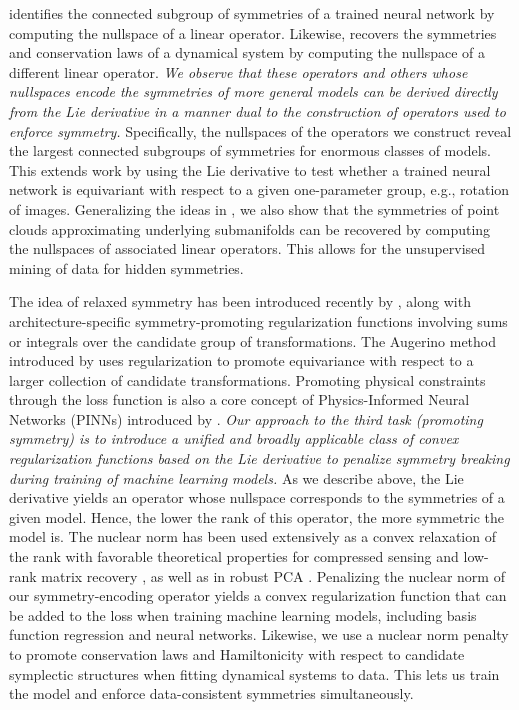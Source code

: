 \documentclass[twoside,11pt]{article}
\begin{document}
\citet{Moskalev2022liegg} identifies the connected subgroup of symmetries of a trained neural network by computing the nullspace of a linear operator.
Likewise, \citet{Kaiser2018discovering,kaiser2021data} recovers the symmetries and conservation laws of a dynamical system by computing the nullspace of a different linear operator.
\emph{We observe that these operators and others whose nullspaces encode the symmetries of more general models can be derived directly from the Lie derivative in a manner dual to the construction of operators used to enforce symmetry.}
Specifically, the nullspaces of the operators we construct reveal the largest connected subgroups of symmetries for enormous classes of models.
This extends work by \cite{Gruver2022Lie} using the Lie derivative to test whether a trained neural network is equivariant with respect to a given one-parameter group, e.g., rotation of images.
Generalizing the ideas in \citet{Cahill2023Lie}, we also show that the symmetries of point clouds approximating underlying submanifolds can be recovered by computing the nullspaces of associated linear operators.
This allows for the unsupervised mining of data for hidden symmetries.

The idea of relaxed symmetry has been introduced recently by \cite{Wang2022approximately}, along with architecture-specific symmetry-promoting regularization functions involving sums or integrals over the candidate group of transformations.
The Augerino method introduced by \cite{Benton2020learning} uses regularization to promote equivariance with respect to a larger collection of candidate transformations.
Promoting physical constraints through the loss function is also a core concept of Physics-Informed Neural Networks (PINNs) introduced by \cite{Raissi2019physics}.
\emph{Our approach to the third task (promoting symmetry) is to introduce a unified and broadly applicable class of convex regularization functions based on the Lie derivative to penalize symmetry breaking during training of machine learning models.}
As we describe above, the Lie derivative yields an operator whose nullspace corresponds to the symmetries of a given model.
Hence, the lower the rank of this operator, the more symmetric the model is.
The nuclear norm has been used extensively as a convex relaxation of the rank with favorable theoretical properties for compressed sensing and low-rank matrix recovery \citep{Recht2010guaranteed, Gross2011recovering}, as well as in robust PCA \citep{Candes2011robust, Bouwmans2018applications}.
Penalizing the nuclear norm of our symmetry-encoding operator yields a convex regularization function that can be added to the loss when training machine learning models, including basis function regression and neural networks.
Likewise, we use a nuclear norm penalty to promote conservation laws and Hamiltonicity with respect to candidate symplectic structures when fitting dynamical systems to data.
This lets us train the model and enforce data-consistent symmetries simultaneously. 
\end{document}
